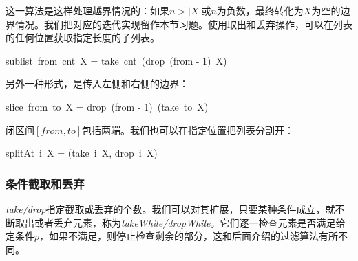 \documentclass[b5paper]{ctexart}
\begin{document}
这一算法是这样处理越界情况的：如果$n > |X|$或$n$为负数，最终转化为$X$为空的边界情况。我们把对应的迭代实现留作本节习题。使用取出和丢弃操作，可以在列表的任何位置获取指定长度的子列表。

\be
sublist\ from\ cnt\ X = take\ cnt\ (drop\ (from - 1)\ X)
\ee

另外一种形式，是传入左侧和右侧的边界：

\be
slice\ from\ to\ X = drop\ (from - 1)\ (take\ to\ X)
\ee

闭区间$[from, to]$包括两端。我们也可以在指定位置把列表分割开：

\be
splitAt\ i\ X = (take\ i\ X, drop\ i\ X)
\label{eq:split-at}
\ee

\begin{Exercise}
\end{Exercise}

\subsubsection{条件截取和丢弃}
 

\textit{take/drop}指定截取或丢弃的个数。我们可以对其扩展，只要某种条件成立，就不断取出或者丢弃元素，称为\textit{takeWhile/dropWhile}。它们逐一检查元素是否满足给定条件$p$，如果不满足，则停止检查剩余的部分，这和后面介绍的过滤算法有所不同。

\be
{}
\ee
\end{document}
